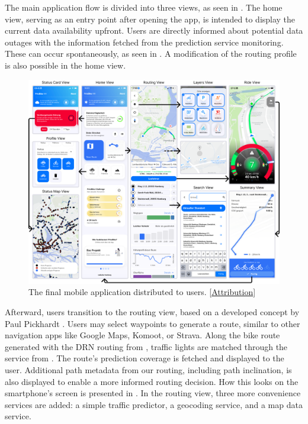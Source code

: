 The main application flow is divided into three views, as seen in . The home view, serving as an entry point after opening the app, is intended to display the current data availability upfront. Users are directly informed about potential data outages with the information fetched from the prediction service monitoring. These can occur spontaneously, as seen in . A modification of the routing profile is also possible in the home view.

\begin{figure}[t]
\caption{The final mobile application distributed to users. [\hyperref[attribution]{Attribution}]}\label{fig:app}
\includegraphics[width=\linewidth]{images/app.png}
\end{figure}

Afterward, users transition to the routing view, based on a developed concept by Paul Pickhardt \cite{pickhardt_2022}. Users may select waypoints to generate a route, similar to other navigation apps like Google Maps, Komoot, or Strava. Along the bike route generated with the DRN routing from , traffic lights are matched through the service from . The route's prediction coverage is fetched and displayed to the user. Additional path metadata from our routing, including path inclination, is also displayed to enable a more informed routing decision. How this looks on the smartphone's screen is presented in . In the routing view, three more convenience services are added: a simple traffic predictor, a geocoding service, and a map data service.

